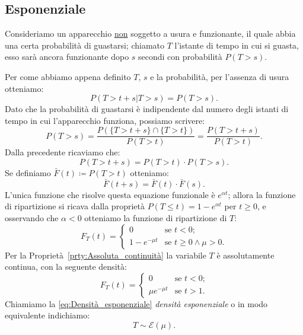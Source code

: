         \subsection{Esponenziale}\label{sec:Densità_Esponenziale}
            \begin{defn}
                Consideriamo un apparecchio \underline{non} soggetto a usura e funzionante, il quale abbia una certa probabilità di guastarsi; chiamato $T$ l'istante di tempo in cui si guasta, esso sarà ancora funzionante dopo $s$ secondi con probabilità $P(T > s)$.

                Per come abbiamo appena definito $T,\,s$ e la probabilità, per l'assenza di usura otteniamo: \[
                    P(T > t + s | T > s) = P(T > s)
                .\] Dato che la probabilità di guastarsi è indipendente dal numero degli istanti di tempo in cui l'apparecchio funziona, possiamo scrivere: \[
                P(T > s) = \frac{P(\{T > t + s\} \cap \{T > t\})}{P(T > t)} = \frac{P(T > t+s)}{P(T > t)}
                .\] Dalla precedente ricaviamo che: \[
                P(T > t + s) = P(T > t) \cdot P(T > s)
            .\] Se definiamo $\bar{F}(t) \coloneqq P(T > t)$ otteniamo: \[
                \bar{F}(t + s) = \bar{F}(t) \cdot \bar{F}(s)
            .\] L'unica funzione che risolve questa equazione funzionale è $e^{\alpha t}$; allora la funzione di ripartizione si ricava dalla proprietà $P(T \leq t) = 1 - e^{\alpha t}$ per $t \geq 0$, e osservando che $\alpha < 0$ otteniamo la funzione di ripartizione di $T$: \[
            F_T(t) = \begin{cases}
                0 & \text{se $t < 0$;} \\
                1 - e^{-\mu t} & \text{se $t \geq 0 \land \mu > 0$.}
            \end{cases}
            \] Per la Proprietà~\ref{prty:Assoluta_continuità} la variabile $T$ è assolutamente continua, con la seguente densità:
            \begin{equation}\label{eq:Densità_esponenziale} 
                F_T(t) = \begin{cases}
                    0 & \text{se $t < 0$;} \\
                    \mu e^{-\mu t} & \text{se $t > 1$.}
                \end{cases}
           \end{equation}
            Chiamiamo la \eqref{eq:Densità_esponenziale} \textit{densità esponenziale} o in modo equivalente indichiamo: \[
                T \sim \mathcal{E}(\mu)
            .\]
            \end{defn}
